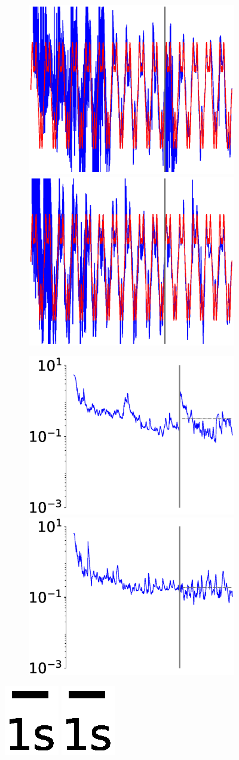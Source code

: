 \begin{figure}
\begin{subfigure}{\textwidth}
            \includegraphics[trim=2cm 1cm 2cm 1cm, clip=true,height=0.1\linewidth,width=.45\linewidth]{Figures/Fig_T6/ImprovP/ST_T2_Seg40_Var_CoordinateY.eps}    
            \includegraphics[trim=2cm 1cm 2cm 1cm, clip=true,height=0.1\linewidth,width=.45\linewidth]{Figures/Fig_T6/ImprovP/ST_T2_Seg50_Var_CoordinateY.eps} 

            \hspace{-1em}
            \includegraphics[height=0.15\linewidth,width=.45\linewidth]{Figures/Fig_T6/ImprovP/ST_T2_Seg40_Var_MSE.eps}
            \hspace{0em}
            \includegraphics[height=0.15\linewidth,width=.45\linewidth]{Figures/Fig_T6/ImprovP/ST_T2_Seg50_Var_MSE.eps}
            
        \end{subfigure}
        
        
        
    
        
        \includegraphics[trim=2cm 6cm 2cm 6cm, clip=true,height=0.05\linewidth,width=.4\linewidth]{Figures/Fig_T1/Python/ST_T1_Scale.eps}
        \includegraphics[trim=2cm 4cm 2cm 6cm, clip=true,height=0.05\linewidth,width=.45\linewidth]{Figures/Fig_T1/Python/ST_T1_Scale.eps}
    



\end{figure}
